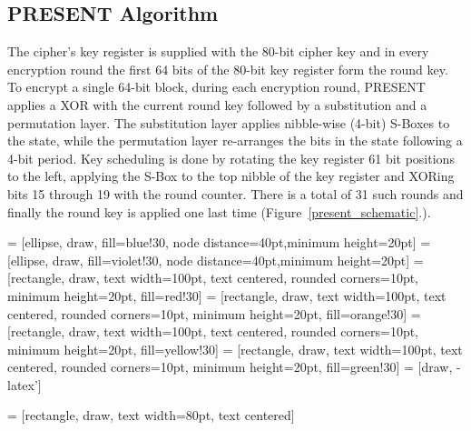 \documentclass[11pt]{llncs2e} %
\begin{document}
\subsection{PRESENT Algorithm}
The cipher's key register is supplied with the 80-bit cipher key and in every encryption round the first 64 bits of the 80-bit key register form the round key.
To encrypt a single 64-bit block, during each encryption round, PRESENT applies a XOR with the current round key followed by a substitution and a permutation layer.
The substitution layer applies nibble-wise (4-bit) S-Boxes to the state, while the permutation layer re-arranges the bits in the state following a 4-bit period.
Key scheduling is done by rotating the key register 61 bit positions to the left, applying the S-Box to the top nibble of the key register and XORing bits 15 through 19 with the round counter.
There is a total of 31 such rounds and finally the round key is applied one last time 
(Figure~\ref{present_schematic}.).

 = [ellipse, draw, fill=blue!30, node distance=40pt,minimum height=20pt]
 = [ellipse, draw, fill=violet!30, node distance=40pt,minimum height=20pt]
 = [rectangle, draw, text width=100pt, text centered, rounded corners=10pt, minimum height=20pt, fill=red!30]
 = [rectangle, draw, text width=100pt, text centered, rounded corners=10pt, minimum height=20pt, fill=orange!30]
 = [rectangle, draw, text width=100pt, text centered, rounded corners=10pt, minimum height=20pt, fill=yellow!30]
 = [rectangle, draw, text width=100pt, text centered, rounded corners=10pt, minimum height=20pt, fill=green!30]
 = [draw, -latex']

 = [rectangle, draw, text width=80pt, text centered]
\end{document}
